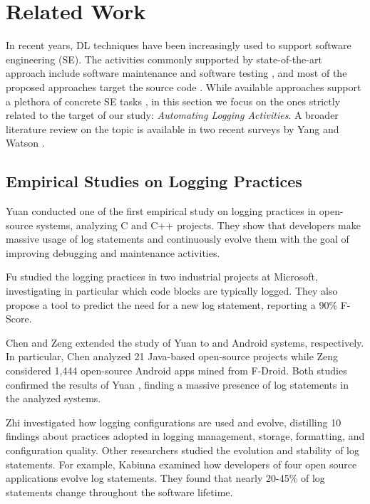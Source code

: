 \section{Related Work} \label{sec:related}


In recent years, DL techniques have been increasingly used to support software engineering (SE). The activities commonly supported by state-of-the-art approach include software maintenance and software testing \cite{yang2020survey}, and most of the proposed approaches target the source code \cite{watson2022systematic}. While available approaches support a plethora of concrete SE tasks \cite{yang2020survey, watson2022systematic}, in this section we focus on the ones strictly related to the target of our study: \textit{Automating Logging Activities}. A broader literature review on the topic is available in two recent surveys by Yang \etal \cite{yang2020survey} and Watson \etal \cite{watson2022systematic}.


\subsection{Empirical Studies on Logging Practices}
Yuan \etal \cite{yuan2012characterizing} conducted one of the first empirical study on logging practices in open-source systems, analyzing C and C++ projects. They show that developers make massive usage of log statements and continuously evolve them with the goal of improving debugging and maintenance activities.

Fu \etal \cite{fu2014developers} studied the logging practices in two industrial projects at Microsoft, investigating in particular which code blocks are typically logged. They also propose a tool to predict the need for a new log statement, reporting a 90\% F-Score.

Chen \cite{chen2017characterizing} and Zeng \etal \cite{zeng2019studying} extended the study of Yuan \etal \cite{yuan2012characterizing} to \java and Android systems, respectively. In particular, Chen analyzed 21 Java-based open-source projects while Zeng \etal considered 1,444 open-source Android apps mined from F-Droid. Both studies confirmed the results of Yuan \etal \cite{yuan2012characterizing}, finding a massive presence of log statements in the analyzed systems. 

Zhi \etal \cite{zhi2019exploratory} investigated how logging configurations are used and evolve, distilling 10 findings about practices adopted in logging management, storage, formatting, and configuration quality. Other researchers studied the evolution and stability  of log statements. For example, Kabinna \etal \cite{kabinna2018examining} examined how developers of four open source applications evolve log statements. They found that nearly 20-45\% of log statements change throughout the software lifetime. 

